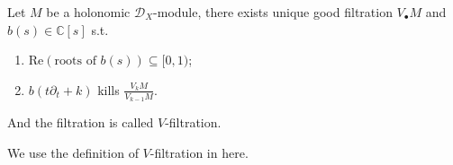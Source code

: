 \begin{theorem}\label{Theorem 8.7}
    Let $M$ be a holonomic $\mathcal{D}_{X}$-module, there exists unique good filtration $V_{\bullet}M$ and $b(s)\in\mathbb{C}[s]$ s.t.
    \begin{enumerate}
        \item $\mathrm{Re}(\text{roots of }b(s))\subseteq[0,1)$;
        \item $b(t\partial_{t}+k)$ kills $\frac{V_{k}M}{V_{k-1}M}$.
    \end{enumerate}
    And the filtration is called $V$-filtration.
\end{theorem}
\begin{remark}
    We use the definition of $V$-filtration in \cite[2.10.21~The Kashiwara-Malgrange filtration. and 2.10.24~The existence]{Bjork1993AnalyticDModules} here.
\end{remark}
